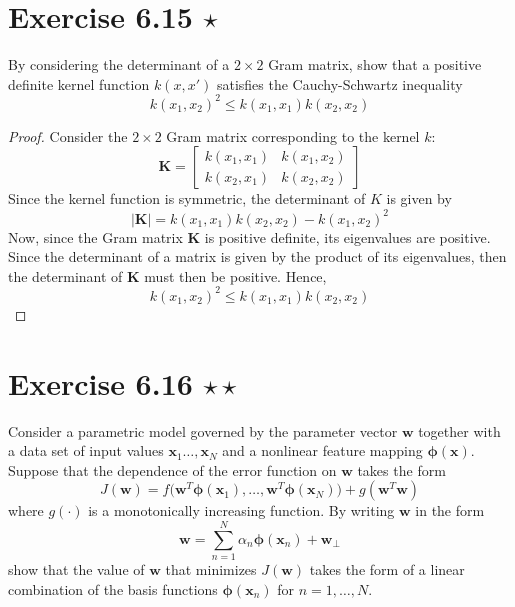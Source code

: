 \section*{Exercise 6.15 $\star$}
By considering the determinant of a $2 \times 2$ Gram matrix,
show that a positive definite kernel function $k(x, x')$ satisfies
the Cauchy-Schwartz inequality
\begin{equation*}
    k(x_1, x_2)^2 \leq k(x_1, x_1)k(x_2, x_2)
    \tag{6.96}\label{eq:6.96}
\end{equation*}

\vspace{1em}

\begin{proof}
    Consider the $2 \times 2$ Gram matrix corresponding to the kernel $k$:
    \[
        \mathbf{K} = 
        \begin{bmatrix}
            k(x_1, x_1) & k(x_1, x_2) \\
            k(x_2, x_1) & k(x_2, x_2)
        \end{bmatrix}
    \] 
    Since the kernel function is symmetric, the determinant of $K$ is given by
    \[
        |\mathbf{K}| = k(x_1, x_1) k(x_2, x_2) - k(x_1, x_2)^2
    \] 
    Now, since the Gram matrix $\mathbf{K}$ is positive definite, its eigenvalues
    are positive. Since the determinant of a matrix is given by the product
    of its eigenvalues, then the determinant of $\mathbf{K}$ must then be positive.
    Hence,
    \begin{equation*}
        k(x_1, x_2)^2 \leq k(x_1, x_1)k(x_2, x_2)
        \tag{6.96}
    \end{equation*}
\end{proof}

\section*{Exercise 6.16 $\star \star$}
Consider a parametric model governed by the parameter vector
$\mathbf{w}$ together with a data set of input values $\mathbf{x}_1
\ldots, \mathbf{x}_N$ and a nonlinear feature mapping $\bm{\phi}(\mathbf{x})$.
Suppose that the dependence of the error function on $\mathbf{w}$ takes the form
\begin{equation}
    J(\mathbf{w}) 
    = f\big(\mathbf{w}^T\bm{\phi}(\mathbf{x}_1), \ldots, \mathbf{w}^T\bm{\phi}(\mathbf{x}_N)\big)
    + g(\mathbf{w}^T \mathbf{w})
    \tag{6.97}\label{eq:6.97}
\end{equation}
where $g(\cdot)$ is a monotonically increasing function. By writing $\mathbf{w}$ in 
the form
\begin{equation}
    \mathbf{w} = \sum_{n=1}^{N}  \alpha_n \bm{\phi}(\mathbf{x}_n) + \mathbf{w}_\perp
    \tag{6.98}\label{eq:6.98}
\end{equation}
show that the value of $\mathbf{w}$ that minimizes $J(\mathbf{w})$ takes the form of a
linear combination of the basis functions $\bm{\phi}(\mathbf{x}_n)$ for $n=1,\ldots,N$.

